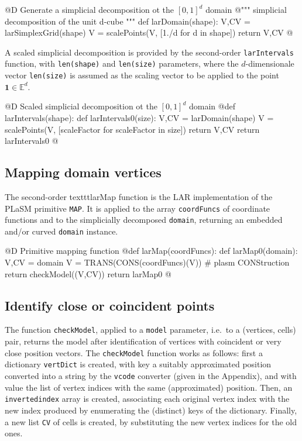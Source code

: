 \documentclass[11pt,oneside]{article}	%
\def\E{\mathbb{E}}
\begin{document}
@D Generate a simplicial decomposition ot the $[0,1]^d$ domain
@{""" simplicial decomposition of the unit d-cube """
def larDomain(shape):
	V,CV = larSimplexGrid(shape)
	V = scalePoints(V, [1./d for d in shape])
	return V,CV
@}

A scaled simplicial decomposition is provided by the second-order  \texttt{larIntervals} function, with \texttt{len(shape)} and \texttt{len(size)} parameters, where the $d$-dimensionale vector \texttt{len(size)} is assumed as the scaling vector to be applied to the point $\mathbf{1}\in\E^d$.

@D Scaled simplicial decomposition ot the $[0,1]^d$ domain
@{def larIntervals(shape):
	def larIntervals0(size):
		V,CV = larDomain(shape)
		V = scalePoints(V, [scaleFactor for scaleFactor in size])
		return V,CV
	return larIntervals0
@}

\subsection{Mapping domain vertices}
The second-order texttt{larMap} function is the LAR implementation of the PLaSM primitive \texttt{MAP}.
It is applied to the array \texttt{coordFuncs} of coordinate functions and to the simplicially decomposed  \texttt{domain}, returning an embedded and/or curved \texttt{domain} instance.

@D Primitive mapping function 
@{def larMap(coordFuncs):
	def larMap0(domain):
		V,CV = domain
		V = TRANS(CONS(coordFuncs)(V))  # plasm CONStruction
		return checkModel((V,CV))
	return larMap0
@}

\subsection{Identify close or coincident points}

The function \texttt{checkModel}, applied to a \texttt{model} parameter, i.e.~to a (vertices, cells)  pair, returns the model after identification of vertices with coincident or very close position vectors.
The \texttt{checkModel} function works as follows: first a dictionary \texttt{vertDict} is created, with key a suitably approximated position converted into a string by the \texttt{vcode} converter (given in the Appendix), and with value the list of vertex indices with the same (approximated) position. Then, an \texttt{invertedindex} array is created, associating each original vertex index with the new index produced by enumerating the (distinct) keys of the dictionary. Finally, a new list \texttt{CV} of cells is created, by substituting the new vertex indices for the old ones. 
\end{document}
